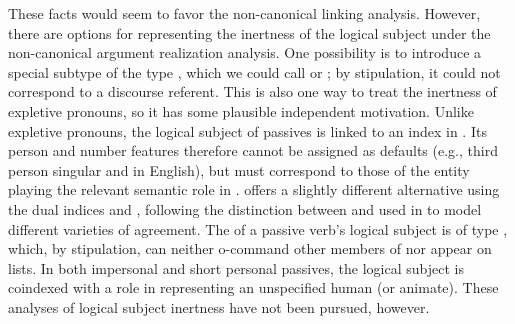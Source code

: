 \documentclass[output=paper
                ,modfonts
                ,nonflat
	        ,collection
	        ,collectionchapter
	        ,collectiontoclongg
 	        ,biblatex
                ,babelshorthands
                ,newtxmath
                ,draftmode
                ,colorlinks, citecolor=brown
]{./langsci/langscibook}
\begin{document}
These facts would seem to favor the non-canonical linking analysis.
However, there are options for representing the inertness of the logical subject under the non-canonical argument realization analysis.
One possibility is to introduce a special subtype of the type , which we could call  or ; by stipulation, it could not correspond to a discourse referent.
This is also one way to treat the inertness of expletive pronouns, so it has some plausible independent motivation.
Unlike expletive pronouns, the logical subject of passives is linked to an index in .
Its person and number features therefore cannot be assigned as defaults (e.g., third person singular  and  in English), but must correspond to those of the entity playing the relevant semantic role in .
\citet[251--253]{Davis2001} offers a slightly different alternative using the dual indices  and , following the distinction between  and  used in \citet[240--250]{Kathol1999b} to model different varieties of agreement.
The  of a passive verb's logical subject is of type , which, by stipulation, can neither o-command other members of \argst nor appear on \val lists.
In both impersonal and short personal passives, the logical subject is coindexed with a role in  representing an unspecified human (or animate).
These analyses of logical subject inertness have not been pursued, however.

\end{document}
